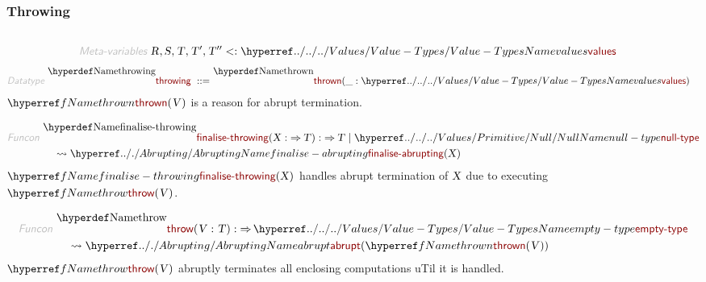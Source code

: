 \subsubsection*{Throwing}\hypertarget{throwing}{}\label{throwing}

\begin{align*}
  [ ~ 
  \KEY{Datatype} ~ & \NAMEREF{throwing} \\
  \KEY{Funcon} ~ & \NAMEREF{thrown} \\
  \KEY{Funcon} ~ & \NAMEREF{finalise-throwing} \\
  \KEY{Funcon} ~ & \NAMEREF{throw} \\
  \KEY{Funcon} ~ & \NAMEREF{handle-thrown} \\
  \KEY{Funcon} ~ & \NAMEREF{handle-recursively} \\
  \KEY{Funcon} ~ & \NAMEREF{catch-else-throw}
  ~ ]
\end{align*}
\begin{align*}
  \KEY{Meta-variables} ~ 
  & \VAR{R}, \VAR{S}, \VAR{T}, \VAR{T}', \VAR{T}'' <: \NAMEHYPER{../../../Values}{Value-Types}{values}
\end{align*}
\begin{align*}
  \KEY{Datatype} ~ 
  \NAMEDECL{throwing}  
  ~ ::= ~ & \NAMEDECL{thrown} (\_ : \NAMEHYPER{../../../Values}{Value-Types}{values})
\end{align*}
$\SHADE{\NAMEREF{thrown}
           ( \VAR{V} )}$ is a reason for abrupt termination.

\begin{align*}
  \KEY{Funcon} ~ 
  & \NAMEDECL{finalise-throwing}(\VAR{X} :  \TO \VAR{T}) :  \TO \VAR{T} \mid \NAMEHYPER{../../../Values/Primitive}{Null}{null-type} \\
  & \quad \leadsto \NAMEHYPER{../.}{Abrupting}{finalise-abrupting}
                     ( \VAR{X} )
\end{align*}
$\SHADE{\NAMEREF{finalise-throwing}
           ( \VAR{X} )}$ handles abrupt termination of $\SHADE{\VAR{X}}$ due to
  executing $\SHADE{\NAMEREF{throw}
           ( \VAR{V} )}$.

\begin{align*}
  \KEY{Funcon} ~ 
  & \NAMEDECL{throw}(\VAR{V} : \VAR{T}) :  \TO \NAMEHYPER{../../../Values}{Value-Types}{empty-type} \\
  & \quad \leadsto \NAMEHYPER{../.}{Abrupting}{abrupt}
                     ( \NAMEREF{thrown}
                         ( \VAR{V} ) )
\end{align*}
$\SHADE{\NAMEREF{throw}
           ( \VAR{V} )}$ abruptly terminates all enclosing computations uTil it is handled.

